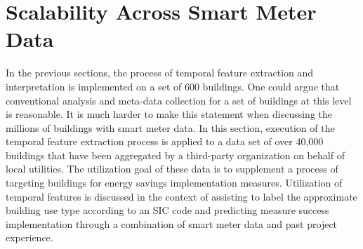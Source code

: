 \section{Scalability Across Smart Meter Data}
\label{sec:scalability}

In the previous sections, the process of temporal feature extraction and interpretation is implemented on a set of 600 buildings. One could argue that conventional analysis and meta-data collection for a set of buildings at this level is reasonable. It is much harder to make this statement when discussing the millions of buildings with smart meter data. In this section, execution of the temporal feature extraction process is applied to a data set of over 40,000 buildings that have been aggregated by a third-party organization on behalf of local utilities. The utilization goal of these data is to supplement a process of targeting buildings for energy savings implementation measures. Utilization of temporal features is discussed in the context of assisting to label the approximate building use type according to an SIC code and predicting measure success implementation through a combination of smart meter data and past project experience.


